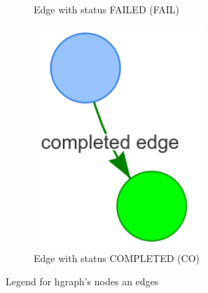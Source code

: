 \begin{figure}[H]
\begin{subfigure}{0.33\textwidth}
    \caption{Edge with status FAILED (FAIL)}%
    \end{subfigure}
    \begin{subfigure}{0.33\textwidth}
    \centering
    \includegraphics[width=0.7\textwidth]{figures/proposed_method/connecting_nodes/legend/completed_edge}
    \caption{Edge with status COMPLETED (CO)}%
    \end{subfigure}
    \caption{Legend for \ac{hgraph}'s nodes an edges}%
    \label{fig:hgraph_legend}
\end{figure}
